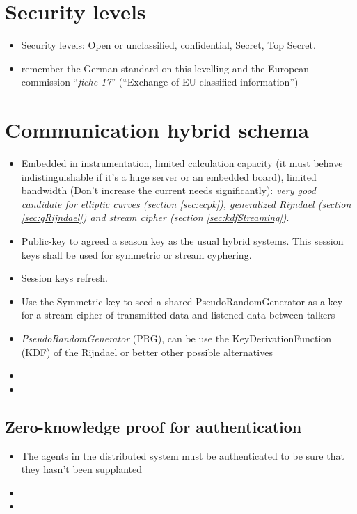 \documentclass[10pt,a4paper,twoside]{llncs}
\begin{document}
%
\section{Security levels \label{sec:secLevel}}

\begin{itemize}
 \item Security levels: Open or unclassified, confidential, Secret, Top Secret.
 \item remember the German standard on this levelling and the European commission ``\emph{fiche 17}'' (``Exchange of EU classified information'')
\end{itemize}

%
\section{Communication hybrid schema \label{sec:intercom}}

\begin{itemize}
 \item Embedded in instrumentation, limited calculation capacity (it must behave indistinguishable if it's a huge server or an embedded board), limited bandwidth (Don't increase the current needs significantly): \emph{very good candidate for elliptic curves (section \ref{sec:ecpk}), generalized Rijndael (section \ref{sec:gRijndael}) and stream cipher (section \ref{sec:kdfStreaming})}.
 \item Public-key to agreed a season key as the usual hybrid systems. This session keys shall be used for symmetric or stream cyphering.
 \item Session keys refresh.
 \item Use the Symmetric key to seed a shared PseudoRandomGenerator as a key for a stream cipher of transmitted data and listened data between talkers
 \item \emph{PseudoRandomGenerator} (PRG), can be use the KeyDerivationFunction (KDF) of the Rijndael or better other possible alternatives
 \item 
 \item 
\end{itemize}

%
\subsection{Zero-knowledge proof for authentication \label{sec:auth}}
\begin{itemize}
 \item The agents in the distributed system must be authenticated to be sure that they hasn't been supplanted
 \item 
 \item 
\end{itemize}
\end{document}
